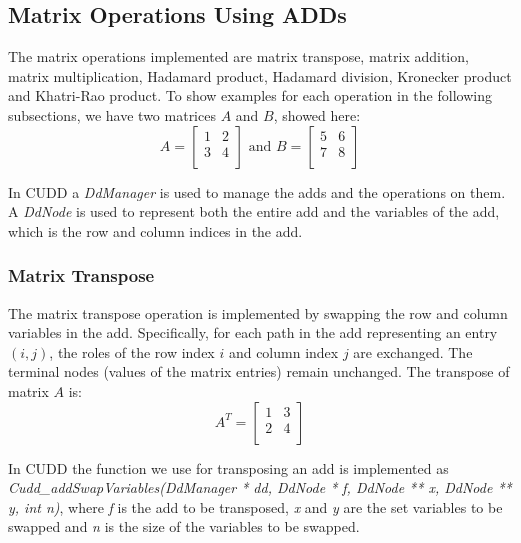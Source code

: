 \subsection{Matrix Operations Using ADDs}\label{subsec:matrix-operations-using-adds}
The matrix operations implemented are matrix transpose, matrix addition, matrix multiplication, Hadamard product, Hadamard division, Kronecker product and Khatri-Rao product.
To show examples for each operation in the following subsections, we have two matrices $A$ and $B$, showed here:
\[
    A = \begin{bmatrix}
            1 & 2 \\
            3 & 4 \\
    \end{bmatrix}
\text{ and }
    B = \begin{bmatrix}
            5 & 6 \\
            7 & 8 \\
    \end{bmatrix}
\]

In CUDD a \textit{DdManager} is used to manage the \glspl{add} and the operations on them.
A \textit{DdNode} is used to represent both the entire \gls{add} and the variables of the \gls{add}, which is the row and column indices in the \gls{add}.

\subsubsection{Matrix Transpose}
The matrix transpose operation is implemented by swapping the row and column variables in the \gls{add}. Specifically, for each path in the \gls{add} representing an entry $(i, j)$, the roles of the row index 
$i$ and column index $j$ are exchanged. The terminal nodes (values of the matrix entries) remain unchanged.
The transpose of matrix $A$ is:
\[
    A^T = \begin{bmatrix}
              1 & 3 \\
              2 & 4 \\
    \end{bmatrix}
\]

In CUDD the function we use for transposing an \gls{add} is implemented as \textit{Cudd\_addSwapVariables(DdManager * dd, DdNode * f, DdNode ** x, DdNode ** y, int  n)}, where \textit{f} is the \gls{add} to be transposed, \textit{x} and \textit{y} are the set variables to be swapped and \textit{n} is the size of the variables to be swapped.

